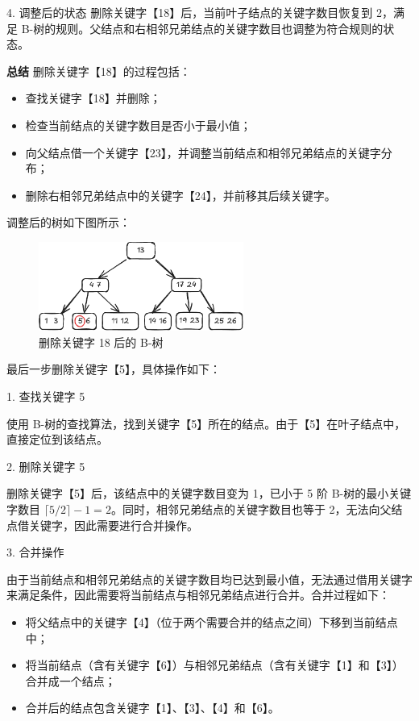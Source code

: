 \documentclass[lang=cn,newtx,10pt,scheme=chinese]{../elegantbook}
\begin{document}
     4. 调整后的状态  
        删除关键字【18】后，当前叶子结点的关键字数目恢复到 2，满足 B-树的规则。父结点和右相邻兄弟结点的关键字数目也调整为符合规则的状态。
     
     
     \textbf{总结}  
     删除关键字【18】的过程包括：
     \begin{itemize}
       \item 查找关键字【18】并删除；
       \item 检查当前结点的关键字数目是否小于最小值；
       \item 向父结点借一个关键字【23】，并调整当前结点和相邻兄弟结点的关键字分布；
       \item 删除右相邻兄弟结点中的关键字【24】，并前移其后续关键字。
     \end{itemize}

     调整后的树如下图所示：
      \begin{figure}[!htbp]
          
            \centering
            \includegraphics[width=0.6\textwidth]{./figure/pdf/cropped/Btree_del4.pdf}
            \caption{删除关键字 18 后的 B-树}
            \label{fig:Btree_delete_18}

      \end{figure}

      最后一步删除关键字【5】，具体操作如下：

      1. 查找关键字 5  

         使用 B-树的查找算法，找到关键字【5】所在的结点。由于【5】在叶子结点中，直接定位到该结点。
      
      2. 删除关键字 5  

         删除关键字【5】后，该结点中的关键字数目变为 1，已小于 5 阶 B-树的最小关键字数目 $\lceil 5/2 \rceil - 1 = 2$。同时，相邻兄弟结点的关键字数目也等于 2，无法向父结点借关键字，因此需要进行合并操作。
      
      3. 合并操作  

         由于当前结点和相邻兄弟结点的关键字数目均已达到最小值，无法通过借用关键字来满足条件，因此需要将当前结点与相邻兄弟结点进行合并。合并过程如下：
         \begin{itemize}
           \item 将父结点中的关键字【4】（位于两个需要合并的结点之间）下移到当前结点中；
           \item 将当前结点（含有关键字【6】）与相邻兄弟结点（含有关键字【1】和【3】）合并成一个结点；
           \item 合并后的结点包含关键字【1】、【3】、【4】和【6】。
         \end{itemize}
      
\end{document}

